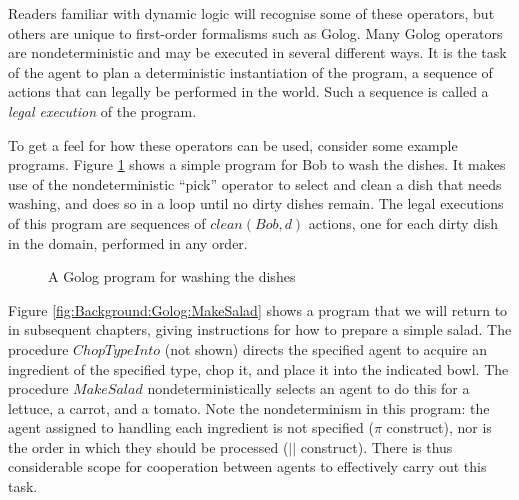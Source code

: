 Readers familiar with dynamic logic will recognise some of these operators,
but others are unique to first-order formalisms such as Golog. Many
Golog operators are nondeterministic and may be executed in several
different ways. It is the task of the agent to plan a deterministic
instantiation of the program, a sequence of actions that can legally
be performed in the world. Such a sequence is called a \emph{legal
execution} of the program.

To get a feel for how these operators can be used, consider some example
programs. Figure \ref{fig:Background:Golog:Washing-Dishes} shows
a simple program for Bob to wash the dishes. It makes use of the nondeterministic
{}``pick'' operator to select and clean a dish that needs washing,
and does so in a loop until no dirty dishes remain. The legal executions
of this program are sequences of $clean(Bob,d)$ actions, one for
each dirty dish in the domain, performed in any order.

%
\begin{figure}
\begin{centering}
\par\end{centering}

\caption{A Golog program for washing the dishes\label{fig:Background:Golog:Washing-Dishes}}

\end{figure}


Figure \ref{fig:Background:Golog:MakeSalad} shows a program that
we will return to in subsequent chapters, giving instructions for
how to prepare a simple salad. The procedure $ChopTypeInto$ (not
shown) directs the specified agent to acquire an ingredient of the
specified type, chop it, and place it into the indicated bowl. The
procedure $MakeSalad$ nondeterministically selects an agent to do
this for a lettuce, a carrot, and a tomato. Note the nondeterminism
in this program: the agent assigned to handling each ingredient is
not specified ($\pi$ construct), nor is the order in which they should
be processed ($||$ construct). There is thus considerable scope for
cooperation between agents to effectively carry out this task.

